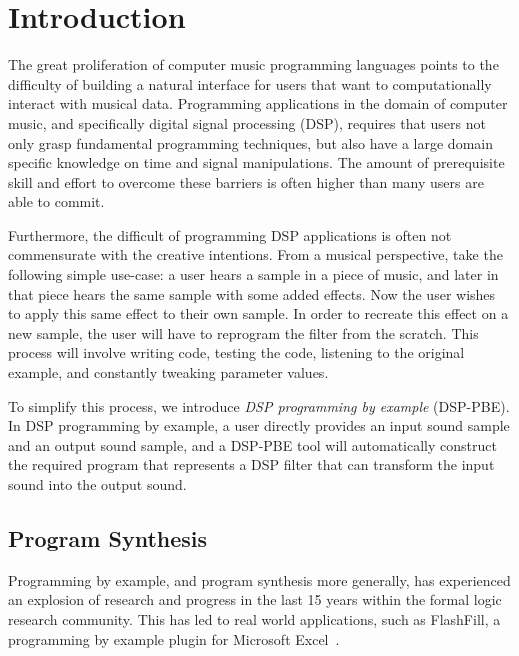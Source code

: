 \section{Introduction}

The great proliferation of computer music programming languages points to the difficulty of building a natural interface for users that want to computationally interact with musical data.
Programming applications in the domain of computer music, and specifically digital signal processing (DSP), requires that users not only grasp fundamental programming techniques, but also have a large domain specific knowledge on time and signal manipulations.
The amount of prerequisite skill and effort to overcome these barriers is often higher than many users are able to commit.

Furthermore, the difficult of programming DSP applications is often not commensurate with the creative intentions.
From a musical perspective, take the following simple use-case: a user hears a sample in a piece of music, and later in that piece hears the same sample with some added effects.
Now the user wishes to apply this same effect to their own sample.
In order to recreate this effect on a new sample, the user will have to reprogram the filter from the scratch.
This process will involve writing code, testing the code, listening to the original example, and constantly tweaking parameter values.

To simplify this process, we introduce \textit{DSP programming by example} (DSP-PBE).
In DSP programming by example, a user directly provides an input sound sample and an output sound sample, and a DSP-PBE tool will automatically construct the required program that represents a DSP filter that can transform the input sound into the output sound.

\subsection{Program Synthesis}
Programming by example, and program synthesis more generally, has experienced an explosion of research and progress in the last 15 years within the formal logic research community.
This has led to real world applications, such as FlashFill, a programming by example plugin for Microsoft Excel~\cite{flashfill}.


